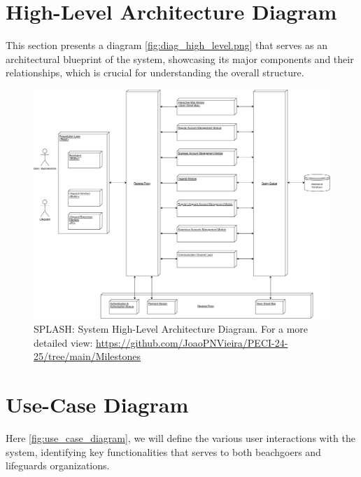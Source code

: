 \newpage
\section{High-Level Architecture Diagram}
\label{section:high_level_diag}
This section presents a diagram \ref{fig:diag_high_level.png} that serves as an architectural blueprint of the system, showcasing its major components and their relationships, which is crucial for understanding the overall structure.

\begin{figure}[H]
      \centering
      \includegraphics[width=16cm]{figs/diag_high_level.png}
      \caption{SPLASH: System High-Level Architecture Diagram. For a more detailed view: \url{https://github.com/JoaoPNVieira/PECI-24-25/tree/main/Milestones}}
      \label{fig:high_level_diag}
\end{figure}

\newpage
\section{Use-Case Diagram}
Here \ref{fig:use_case_diagram}, we will define the various user interactions with the system, identifying key functionalities that serves to both beachgoers and lifeguards organizations. 

